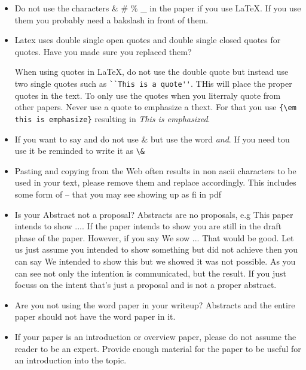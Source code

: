 \begin{itemize}[label=$\Box$]
\item Do not use the characters \& \# \% \_  in the paper if you use
  LaTeX. If you use them you probably need a bakslash in front of them.

\item Latex uses double single open quotes and double single closed
  quotes for quotes. Have you made sure you replaced them?

  When using quotes in LaTeX, do not use the double quote but instead
  use two single quotes such as \verb|``This is a quote''|. THis will
  place the proper quotes in the text. To only use the quotes when you
  literraly quote from other papers. Never use a quote to emphasize a
  thext. For that you use \verb|{\em this is emphasize}| resulting in
  {\em This is emphasized}.

\item If you want to say and do not use \& but use the word {\em
    and}. If you need tou use it be reminded to write it as \verb|\&|


\item Pasting and copying from the Web often results in non ascii
  characters to be used in your text, please remove them and replace
  accordingly. This includes some form of -- that you may see showing
  up as fi in pdf

\item Is your Abstract not a proposal? Abstracts are no proposals, e.g
  This paper intends to show .... If the paper intends to show you are
  still in the draft phase of the paper. However, if you say We sow
  ... That would be good. Let us just assume you intended to show
  something but did not achieve then you can say We intended to show
  this but we showed it was not possible. As you can see not only the
  intention is communicated, but the result. If you just focuss on the
  intent that's just a proposal and is not a proper abstract.

\item Are you not using the word paper in your writeup?  Abstracts and
  the entire paper should not have the word paper in it.

\item If your paper is an introduction or overview paper, please do
  not assume the reader to be an expert. Provide enough material for
  the paper to be useful for an introduction into the topic. 


\end{itemize}
